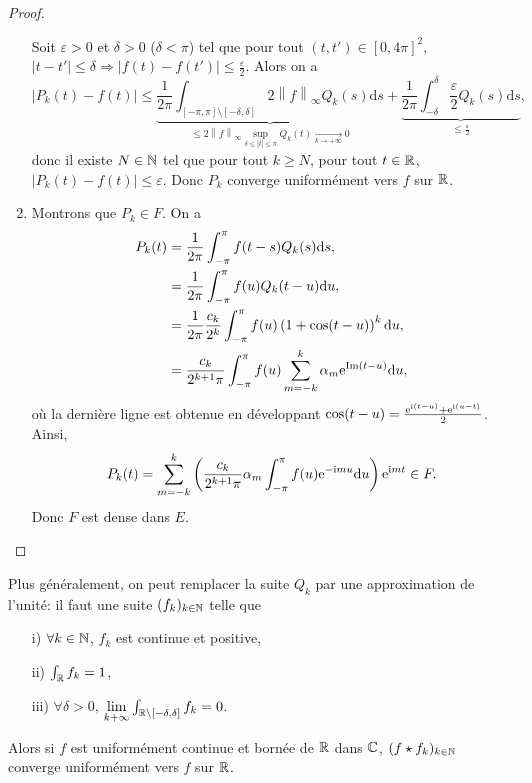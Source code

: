 \begin{proof}
\begin{enumerate}
        Soit $\varepsilon>0$ et $\delta>0$ ($\delta<\pi$) tel que pour tout $(t,t')\in[0,4\pi]^{2}$, $\left\lvert t-t'\right\rvert\leqslant\delta\Rightarrow\left\lvert f(t)-f(t')\right\rvert\leqslant\frac{\varepsilon}{2}$. Alors on a 
        \begin{equation}
            \left\lvert P_{k}(t)-f(t)\right\rvert\leqslant\underbrace{\frac{1}{2\pi}\int_{[-\pi,\pi]\setminus[-\delta,\delta]}2\left\lVert f\right\rVert_{\infty}Q_{k}(s)\mathrm{d}s}_{\leqslant2\left\lVert f\right\rVert_{\infty}\sup\limits_{\delta\leqslant\left\lvert t\right\rvert \leqslant\pi}Q_{k}(t)\xrightarrow[k\to+\infty]{}0}+\underbrace{\frac{1}{2\pi}\int_{-\delta}^{\delta}\frac{\varepsilon}{2}Q_{k}(s)\mathrm{d}s}_{\leqslant\frac{\varepsilon}{2}},
        \end{equation}
        donc il existe $N\in\mathbb{N}$ tel que pour tout $k\geqslant N$, pour tout $t\in\mathbb{R}$, $\left\lvert P_{k}(t)-f(t)\right\rvert\leqslant\varepsilon$. Donc $P_{k}$ converge uniformément vers $f$ sur $\mathbb{R}$.

        \item Montrons que $P_{k}\in F$. On a 
        \begin{align}
            P_{k}(t)
            &=\frac{1}{2\pi}\int_{-\pi}^{\pi}f(t-s)Q_{k}(s)\mathrm{d}s,\\
            &=\frac{1}{2\pi}\int_{-\pi}^{\pi}f(u)Q_{k}(t-u)\mathrm{d}u,\\
            &=\frac{1}{2\pi}\frac{c_{k}}{2^{k}}\int_{-\pi}^{\pi}f(u)\left(1+\cos(t-u)\right)^{k}\mathrm{d}u,\\
            &=\frac{c_{k}}{2^{k+1}\pi}\int_{-\pi}^{\pi}f(u)\sum_{m=-k}^{k}\alpha_{m}\mathrm{e}^{\mathrm{Im}(t-u)}\mathrm{d}u,
        \end{align}
        où la dernière ligne est obtenue en développant $\cos(t-u)=\frac{\mathrm{e}^{\mathrm{i}(t-u)}+\mathrm{e}^{\mathrm{i}(u-t)}}{2}$.
        Ainsi, 
        \begin{equation}
            P_{k}(t)=\sum_{m=-k}^{k}\left(\frac{c_{k}}{2^{k+1}\pi}\alpha_{m}\int_{-\pi}^{\pi}f(u)\mathrm{e}^{-\mathrm{i} mu}\mathrm{d}u\right)\mathrm{e}^{\mathrm{i} mt}\in F.
        \end{equation}
        Donc $F$ est dense dans $E$.
    \end{enumerate}
\end{proof}

\begin{remark}
    Plus généralement, on peut remplacer la suite $Q_{k}$ par une \og approximation de l'unité\fg : il faut une suite $(f_{k})_{k\in\mathbb{N}}$ telle que
    \begin{enumerate}
        \item [i)] $\forall k\in\mathbb{N}$, $f_{k}$ est continue et positive,
        \item [ii)] $\int_{\mathbb{R}}f_{k}=1$,
        \item [iii)] $\forall\delta >0$, $\lim\limits_{k+\infty}\int_{\mathbb{R}\setminus[-\delta,\delta]}f_{k}=0$.
    \end{enumerate}
    Alors si $f$ est uniformément continue et bornée de $\mathbb{R}$ dans $\mathbb{C}$, $(f\star f_{k})_{k\in\mathbb{N}}$ converge uniformément vers $f$ sur $\mathbb{R}$.
\end{remark}

